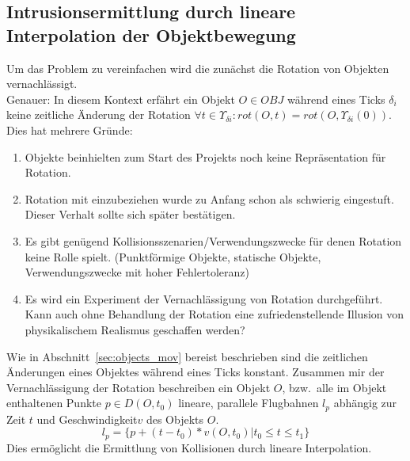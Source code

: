 \subsection{Intrusionsermittlung durch lineare Interpolation der Objektbewegung}
Um das Problem zu vereinfachen wird die zunächst die Rotation von Objekten vernachlässigt.\\
Genauer: In diesem Kontext erfährt ein Objekt $O\in OBJ$ während eines Ticks $\delta_i$ keine zeitliche Änderung der Rotation $\forall t \in \Upsilon_{\delta i} : rot(O, t) = rot(O, \Upsilon_{\delta i}(0))$. Dies hat mehrere Gründe:
\begin{enumerate}
\item Objekte beinhielten zum Start des Projekts noch keine Repräsentation für Rotation.
\item Rotation mit einzubeziehen wurde zu Anfang schon als schwierig eingestuft. Dieser Verhalt sollte sich später bestätigen.
\item Es gibt genügend Kollisionsszenarien/Verwendungszwecke für denen Rotation keine Rolle spielt. (Punktförmige Objekte, statische Objekte, Verwendungszwecke mit hoher Fehlertoleranz)
\item Es wird ein Experiment der Vernachlässigung von Rotation durchgeführt. Kann auch ohne Behandlung der Rotation eine zufriedenstellende Illusion von physikalischem Realismus geschaffen werden?
\end{enumerate}

Wie in Abschnitt~\ref{sec:objects_mov} bereist beschrieben sind die zeitlichen Änderungen eines Objektes während eines Ticks konstant. Zusammen mir der Vernachlässigung der Rotation beschreiben ein Objekt $O$, bzw.~alle im Objekt enthaltenen Punkte $p \in D(O, t_0)$ lineare, parallele Flugbahnen $l_p$ abhängig zur Zeit $t$ und Geschwindigkeit$v$ des Objekts $O$.
$$l_p = \{p + (t - t_0) * v(O, t_0) | t_0 \leq t \leq t_1\}$$ 
Dies ermöglicht die Ermittlung von Kollisionen durch lineare Interpolation.\\

